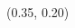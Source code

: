 \documentclass[final]{beamer} %
\makeatletter
\renewcommand\LARGE{\@setfontsize\LARGE{56pt}{56}}
\renewcommand\Large{\@setfontsize\Large{36pt}{42}}
\makeatother
\begin{document}
\begin{frame}
\begin{textblock}{0.3}

    

  \end{textblock}
\endgroup



\begingroup
  \begin{textblock}{0.3}(0.35, 0.20)


\end{textblock}
\end{frame}
\end{document}
